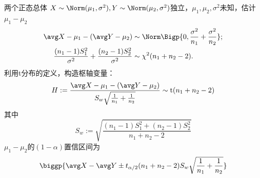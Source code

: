 \begin{example}{两个正态总体}{}
	$X\sim\Norm(\mu_1,\sigma^2),Y\sim\Norm(\mu_2,\sigma^2)$独立，$\mu_1,\mu_2,\sigma^2$未知，估计$\mu_1-\mu_2$
	\begin{align*}
		\avg X-\mu_1-(\avg Y-\mu_2)&\sim\Norm\Bigp{0,\frac{\sigma^2}{n_1}+\frac{\sigma^2}{n_2}};\\
		\frac{(n_1-1)S_1^2}{\sigma^2}+\frac{(n_2-1)S_2^2}{\sigma^2}&\sim\chi^2(n_1+n_2-2).
	\end{align*}
	利用t分布的定义，构造枢轴变量：
	\[
		H:=\frac{\avg X-\mu_1-(\avg Y-\mu_2)}{S_w\sqrt{\frac1{n_1}+\frac1{n_2}}}\sim\mathrm t(n_1+n_2-2)
	\]
	其中 
	\[
		S_w:=\sqrt{\frac{(n_1-1)S_1^2+(n_2-1)S_2^2}{n_1+n_2-2}}
	\]
	$\mu_1-\mu_2$的$(1-\alpha)$置信区间为
	\[
		\biggp{\avg X-\avg Y\pm t_{\alpha/2}(n_1+n_2-2)S_w\sqrt{\frac1{n_1}+\frac1{n_2}}}
	\]
\end{example}
